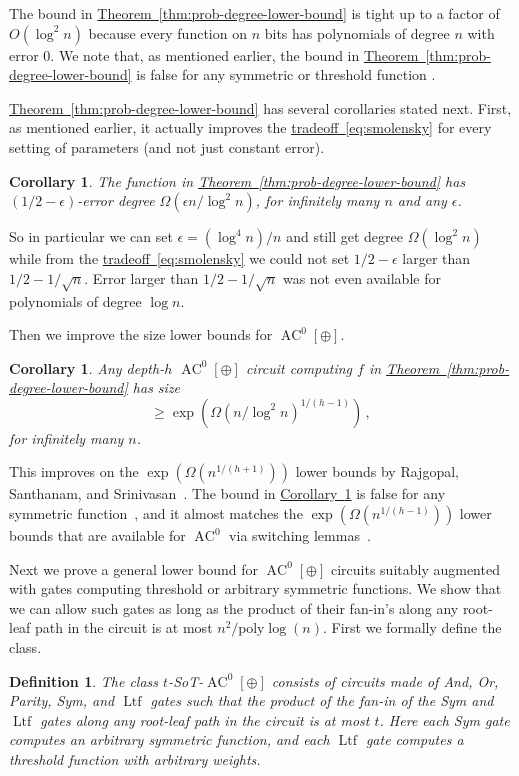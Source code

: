 \documentclass[11pt]{article}
\newcommand{\expref}[2]{\texorpdfstring{\hyperref[#2]{#1~\ref{#2}}}{#1~\ref{#2}}}
\newcommand{\expeqref}[2]{\texorpdfstring{\hyperref[#2]{#1~\eqref{#2}}}{#1~\eqref{#2}}}
\newtheorem{cor}[theorem]{Corollary}
\newtheorem{defn}[theorem]{Definition}
\DeclareMathOperator{\Ltf}{\mathrm{Ltf}}  %
\DeclareMathOperator{\AC}{\mathrm{AC}}  %
\newcommand{\poly}{\mathrm{poly}}
\newcommand{\e}{\epsilon}
\begin{document}
The bound in \expref{Theorem}{thm:prob-degree-lower-bound} is tight up
to a factor of $O(\log^{2}n)$ because every function on $n$ bits
has polynomials of degree $n$ with error $0$. We note that, as mentioned
earlier, the bound in \expref{Theorem}{thm:prob-degree-lower-bound} is
false for any symmetric or threshold function
\cite{DBLP:conf/fsttcs/Srinivasan13,DBLP:conf/focs/AlmanW15}.

\expref{Theorem}{thm:prob-degree-lower-bound} has several corollaries
stated next. First, as mentioned earlier, it actually improves the
\expeqref{tradeoff}{eq:smolensky} for every setting of parameters (and
not just constant error).
\begin{cor}
\label{cor:tradeoff}The function in \expref{Theorem}{thm:prob-degree-lower-bound}
has $(1/2-\e)$-error degree $\Omega(\e n/\log^{2}n)$, for infinitely
many $n$ and any $\e$.
\end{cor}

So in particular we can set $\e=(\log^{4}n)/n$ and still get degree
%
$\Omega(\log^{2}n)$ while  %
from the \expeqref{tradeoff}{eq:smolensky}
we could not set $1/2-\e$ larger than $1/2-1/\sqrt{n}$. Error larger
than $1/2-1/\sqrt{n}$ was not even available for polynomials of degree
$\log n$.

%

Then we improve the size lower bounds for $\AC^{0}[\oplus]$.
\begin{cor}          %
\label{cor:size}Any depth-$h$ $\AC^{0}[\oplus]$ circuit computing
$f$ in \expref{Theorem}{thm:prob-degree-lower-bound} has size
%
%
\[ \ge\exp(\Omega(n/\log^{2}n)^{1/(h-1)})\,, \]  %
for infinitely many $n$.
\end{cor}

This improves on the $\exp(\Omega(n^{1/(h+1)}))$ lower bounds
%
%
by Rajgopal, Santhanam, and Srinivasan~\cite{DBLP:conf/mfcs/RajgopalS018}.
The bound in \expref{Corollary}{cor:size} is false for any symmetric
function~\cite{DBLP:conf/coco/OliveiraS019}, and it almost matches
the $\exp(\Omega(n^{1/(h-1)}))$ lower bounds that are available for
$\AC^{0}$ via switching lemmas~\cite{Has87}.

Next we prove a general lower bound for $\AC^{0}[\oplus]$ circuits
suitably augmented with gates computing threshold or arbitrary symmetric
functions. We show that we can allow such gates as long as the product
of their fan-in's along any root-leaf path in the circuit is at most
%
$n^{2}/\poly\log(n)$.   %
First we formally define the class.
\begin{defn}
The class $t$-SoT-$\AC^{0}[\oplus]$ consists of circuits made of
And, Or, Parity, Sym, and $\Ltf$ gates such that the product of the fan-in
of the Sym and $\Ltf$ gates along any root-leaf path in the circuit is
at most $t$. Here each Sym gate computes an arbitrary symmetric function,
and each $\Ltf$ gate computes a threshold function with arbitrary weights.
\end{defn}
\end{document}
